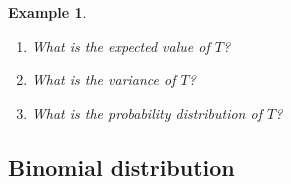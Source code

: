 \documentclass[12pt]{amsart}
\newtheorem{example}[theorem]{Example}
\begin{document}
{\begin{example}
\begin{enumerate}
\vspace{2cm}

\item What is the expected value of $T$?

\vspace{3.5cm}

\item What is the variance of $T$?

\vspace{4cm}
%


\item What is the probability distribution of $T$?


\end{enumerate}


\end{example} 


\newpage




\subsection{Binomial distribution}

}
\end{document}
